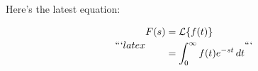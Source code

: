 \documentclass{article}
\begin{document}
Here's the latest equation:

\[```latex
\begin{aligned}
F(s) &= \mathcal{L} \{ f(t) \} \\
     &= \int_{0}^{\infty} f(t) e^{-st} \, dt
\end{aligned}
```\]
\end{document}

